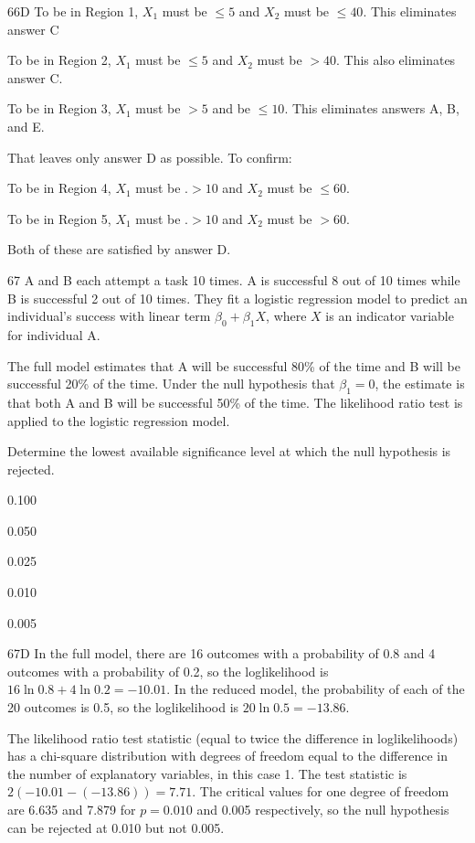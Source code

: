\begin{solution}{66}{D}
To be in Region 1, $X_1$ must be $\leqslant 5$ and $X_2$ must be $\leqslant 40$.
This eliminates answer C

To be in Region 2, $X_1$ must be $\leqslant 5$ and $X_2$ must be $> 40$. This also eliminates answer C.

To be in Region 3, $X_1$ must be $> 5$ and be $\leqslant 10$. This eliminates answers A, B, and E.

That leaves only answer D as possible. To confirm:

To be in Region 4, $X_1$ must be .$> 10$ and $X_2$ must be $\leqslant 60$.

To be in Region 5, $X_1$ must be .$> 10$ and $X_2$ must be $> 60$.

Both of these are satisfied by answer D.
\end{solution}

\begin{question}{67}
A and B each attempt a task 10 times. A is successful 8 out of 10 times while B is successful 2 out of 10 times. They fit a logistic regression model to predict an individual's success with linear term $\beta_0 + \beta_1 X$, where $X$ is an indicator variable for individual A.

The full model estimates that A will be successful 80\% of the time and B will be successful 20\% of the time. Under the null hypothesis that $\beta_1 = 0$, the estimate is that both A and B will be successful 50\% of the time. The likelihood ratio test is applied to the logistic regression model.

Determine the lowest available significance level at which the null hypothesis is rejected.

\begin{choices}
\item 0.100
\item 0.050
\item 0.025
\item 0.010
\item 0.005
\end{choices}
\end{question}
\begin{solution}{67}{D}
In the full model, there are 16 outcomes with a probability of 0.8 and 4 outcomes with a probability of 0.2, so the loglikelihood is $16 \ln 0.8 + 4 \ln 0.2 = -10.01$. In the reduced model, the probability of each of the 20 outcomes is 0.5, so the loglikelihood is $20 \ln 0.5 = -13.86$.

The likelihood ratio test statistic (equal to twice the difference in loglikelihoods) has a chi-square distribution with degrees of freedom equal to the difference in the number of explanatory variables, in this case 1. The test statistic is $2(-10.01 - (-13.86)) = 7.71$. The critical values for one degree of freedom are 6.635 and 7.879 for $p = 0.010$ and 0.005 respectively, so the null hypothesis can be rejected at 0.010 but not 0.005.
\end{solution}

